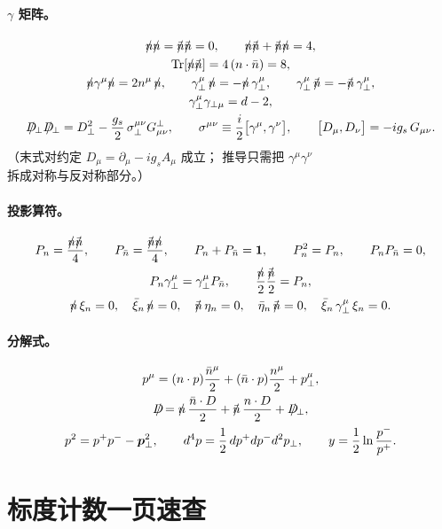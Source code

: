 \documentclass[UTF8,a4paper,11pt]{ctexart}
\theoremstyle{definition}
\theoremstyle{remark}
\theoremstyle{plain}
\newcommand{\nsl}{n\mkern-10.5mu/\mkern1.5mu}
\newcommand{\nbsl}{\bar{n}\mkern-10.5mu/\mkern1.5mu}
\newcommand{\Dsl}{D\mkern-11.5mu/}
\newcommand{\pperp}{\bm{p}_\perp}
\newcommand{\Tr}{\mathrm{Tr}}
\begin{document}
\paragraph{$\gamma$ 矩阵。}
\begin{gather}
  \nsl\nsl=\nbsl\nbsl=0,
  \qquad
  \nsl\nbsl+\nbsl\nsl=4,\\
  \Tr[\nsl\nbsl]=4\,(n\cdot\bar n)=8,\\
  \nsl\gamma^\mu\nsl=2n^\mu\,\nsl,
  \qquad
  \gamma_\perp^\mu\,\nsl=-\nsl\,\gamma_\perp^\mu,
  \qquad
  \gamma_\perp^\mu\,\nbsl=-\nbsl\,\gamma_\perp^\mu,\\
  \gamma_\perp^\mu\gamma_{\perp\mu}=d-2,\\
  \Dsl_\perp\Dsl_\perp=D_\perp^2-\frac{g_s}{2}\,
  \sigma_\perp^{\mu\nu}G^\perp_{\mu\nu},
  \qquad
  \sigma^{\mu\nu}\equiv\frac{i}{2}\big[\gamma^\mu,\gamma^\nu\big],
  \qquad
  \big[D_\mu,D_\nu\big]=-ig_s\,G_{\mu\nu} .
\end{gather}
（末式对约定 $D_\mu=\partial_\mu-ig_sA_\mu$ 成立；
推导只需把 $\gamma^\mu\gamma^\nu$ 拆成对称与反对称部分。）

\paragraph{投影算符。}
\begin{gather}
  P_n=\frac{\nsl\nbsl}{4},\qquad P_{\bar n}=\frac{\nbsl\nsl}{4},
  \qquad P_n+P_{\bar n}=\mathbf1,\qquad P_n^2=P_n,\qquad P_nP_{\bar n}=0,\\
  P_n\gamma_\perp^\mu=\gamma_\perp^\mu P_{\bar n},
  \qquad
  \frac{\nsl}{2}\frac{\nbsl}{2}=P_n,\\
  \nsl\,\xi_n=0,\quad \bar\xi_n\,\nsl=0,\quad
  \nbsl\,\eta_n=0,\quad \bar\eta_n\,\nbsl=0,\quad
  \bar\xi_n\,\gamma_\perp^\mu\,\xi_n=0 .
\end{gather}

\paragraph{分解式。}
\begin{gather}
  p^\mu=(n\cdot p)\frac{\bar n^\mu}{2}+(\bar n\cdot p)\frac{n^\mu}{2}+p_\perp^\mu,\\
  \Dsl=\nsl\,\frac{\bar n\cdot D}{2}+\nbsl\,\frac{n\cdot D}{2}+\Dsl_\perp,\\
  p^2=p^+p^--\pperp^2,
  \qquad
  d^4p=\frac12\,dp^+dp^-d^2p_\perp,
  \qquad
  y=\frac12\ln\frac{p^-}{p^+} .
\end{gather}

\section{标度计数一页速查}
\label{app:counting}
\end{document}
